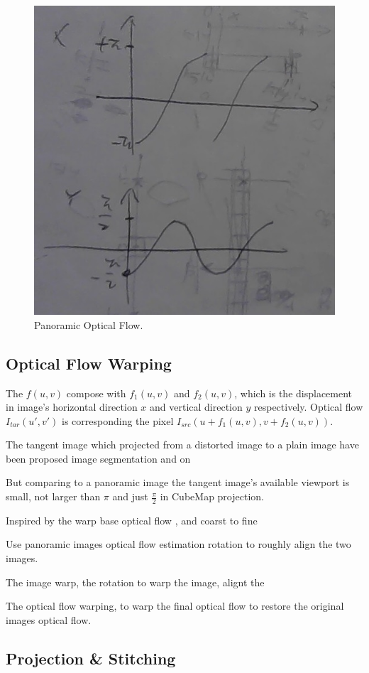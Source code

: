 \begin{figure}[hbt!]
	\centering
	\includegraphics[width=0.45\linewidth]{images/wrap-around-0.jpg}
	\caption{Panoramic Optical Flow.}
	\label{fig:app:warparound}
\end{figure}


\subsection{Optical Flow Warping}\label{sec:approach:warping}


The $f(u,v)$ compose with $f_1(u,v)$ and $f_2(u,v)$, which is the displacement in image's horizontal direction $x$ and vertical direction $y$ respectively.
Optical flow 
$I_{tar}(u',v')$ is corresponding the pixel $I_{src}(u + f_1(u,v), v + f_2(u,v))$.


The tangent image which projected from a distorted image to a plain image have been proposed image segmentation and on ~\cite{eldercvpr2020}

But comparing to a panoramic image the tangent image's available viewport is small, not larger than $\pi$ and just $\frac{\pi}{2}$ in CubeMap projection.

Inspired by the warp base optical flow \cite{?}, and coarst to fine 

Use panoramic images optical flow estimation rotation to roughly align the two images.


The image warp, the rotation to warp the image, alignt the 

The optical flow warping, to warp the final optical flow to restore the original images optical flow.


\subsection{Projection \& Stitching}\label{sec:approach:projstit}


